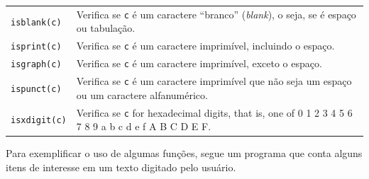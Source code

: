 \documentclass[
  11pt,
  a4paper,
]{scrbook}
\begin{document}
\begin{longtable}[]{@{}
  >{\centering\arraybackslash}p{}
  >{\raggedright\arraybackslash}p{}@{}}
\texttt{isblank(c)} & Verifica se \texttt{c} é um caractere ``branco''
(\emph{blank}), o seja, se é espaço ou tabulação. \\
\texttt{isprint(c)} & Verifica se \texttt{c} é um caractere imprimível,
incluindo o espaço. \\
\texttt{isgraph(c)} & Verifica se \texttt{c} é um caractere imprimível,
exceto o espaço. \\
\texttt{ispunct(c)} & Verifica se \texttt{c} é um caractere imprimível
que não seja um espaço ou um caractere alfanumérico. \\
\texttt{isxdigit(c)} & Verifica se \texttt{c} for hexadecimal digits,
that is, one of 0 1 2 3 4 5 6 7 8 9 a b c d e f A B C D E F. \\
\end{longtable}

Para exemplificar o uso de algumas funções, segue um programa que conta
alguns itens de interesse em um texto digitado pelo usuário.
\end{document}
